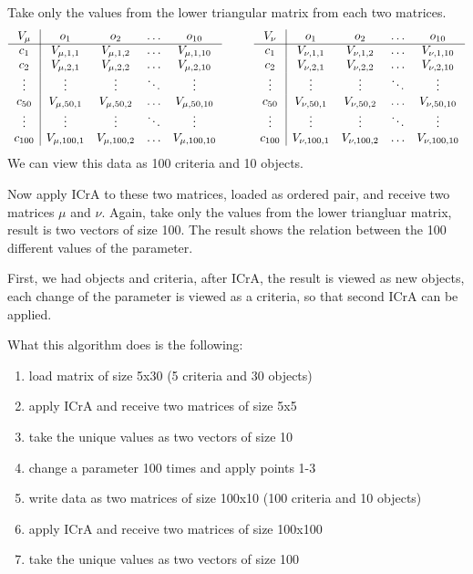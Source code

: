 \documentclass[12pt, a4paper]{article}
\begin{document}
Take only the values from the lower triangular matrix from each two matrices.
\[ \begin{array}{c|ccccccc|cccc}
V_\mu & o_1 & o_2 & \ldots & o_{10} & & & V_\nu & o_1 & o_2 & \ldots & o_{10} \\
\cline{1-5} \cline{8-12}
c_1 & V_{\mu,1,1} & V_{\mu,1,2} & \ldots & V_{\mu,1,10} & \mbox{ } & \mbox{ } & c_1 & V_{\nu,1,1} & V_{\nu,1,2} & \ldots & V_{\nu,1,10} \\
c_2 & V_{\mu,2,1} & V_{\mu,2,2} & \ldots & V_{\mu,2,10} & \mbox{ } & \mbox{ } & c_2 & V_{\nu,2,1} & V_{\nu,2,2} & \ldots & V_{\nu,2,10} \\
\vdots & \vdots & \vdots & \ddots & \vdots &   &   & \vdots & \vdots & \vdots & \ddots & \vdots \\
c_{50} & V_{\mu,50,1} & V_{\mu,50,2} & \ldots & V_{\mu,50,10} & \mbox{ } & \mbox{ } & c_{50} & V_{\nu,50,1} & V_{\nu,50,2} & \ldots & V_{\nu,50,10} \\
\vdots & \vdots & \vdots & \ddots & \vdots &   &   & \vdots & \vdots & \vdots & \ddots & \vdots \\
c_{100} & V_{\mu,100,1} & V_{\mu,100,2} & \ldots & V_{\mu,100,10} & \mbox{ } & \mbox{ } & c_{100} & V_{\nu,100,1} & V_{\nu,100,2} & \ldots & V_{\nu,100,10}
\end{array} \]
We can view this data as 100 criteria and 10 objects.

Now apply ICrA to these two matrices, loaded as ordered pair, and receive two matrices $\mu$ and $\nu$.
Again, take only the values from the lower triangluar matrix, result is two vectors of size 100.
The result shows the relation between the 100 different values of the parameter.

First, we had objects and criteria, after ICrA, the result is viewed as new objects,
each change of the parameter is viewed as a criteria, so that second ICrA can be applied.

\bigskip
What this algorithm does is the following:
\begin{enumerate}
\item load matrix of size 5x30 (5 criteria and 30 objects)
\item apply ICrA and receive two matrices of size 5x5
\item take the unique values as two vectors of size 10
\item change a parameter 100 times and apply points 1-3
\item write data as two matrices of size 100x10 (100 criteria and 10 objects)
\item apply ICrA and receive two matrices of size 100x100
\item take the unique values as two vectors of size 100
\end{enumerate}
\end{document}
